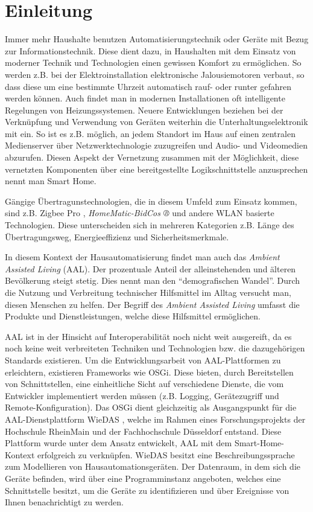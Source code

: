 \chapter{Einleitung}

Immer mehr Haushalte benutzen Automatisierungstechnik oder Geräte mit Bezug zur Informationstechnik.
Diese dient dazu, in Haushalten mit dem Einsatz von moderner Technik und Technologien einen gewissen Komfort
zu ermöglichen.
So werden z.B. bei der Elektroinstallation elektronische Jalousiemotoren verbaut, so dass diese
um eine bestimmte Uhrzeit automatisch rauf- oder runter gefahren werden können.
Auch findet man in modernen Installationen oft intelligente Regelungen von Heizungssystemen.
Neuere Entwicklungen beziehen bei der Verknüpfung und Verwendung von Geräten weiterhin die
Unterhaltungselektronik mit ein.
So ist es z.B. möglich, an jedem Standort im Haus auf einen zentralen Medienserver über Netzwerktechnologie
zuzugreifen und Audio- und Videomedien abzurufen.
Diesen Aspekt der Vernetzung zusammen mit der Möglichkeit, diese vernetzten Komponenten über eine
bereitgestellte Logikschnittstelle anzusprechen nennt man Smart Home.

Gängige Übertragunstechnologien, die in diesem Umfeld zum Einsatz kommen, sind z.B.
Zigbee Pro \cite{zigbee_p}, \emph{HomeMatic-BidCos ®} \cite{homematic_eq3} und andere WLAN basierte
Technologien.
Diese unterscheiden sich in mehreren Kategorien z.B. Länge des Übertragungsweg, Energieeffizienz und
Sicherheitsmerkmale.

In diesem Kontext der Hausautomatisierung findet man auch das \emph{Ambient Assisted Living} (AAL).
Der prozentuale Anteil der alleinstehenden und älteren Bevölkerung steigt stetig.
Dies nennt man den ``demografischen Wandel''.
Durch die Nutzung und Verbreitung technischer Hilfsmittel im Alltag versucht man, diesen Menschen
zu helfen.
Der Begriff des \emph{Ambient Assisted Living} umfasst die Produkte und Dienstleistungen, welche
diese Hilfsmittel ermöglichen.

AAL ist in der Hinsicht auf Interoperabilität noch nicht weit ausgereift, da es noch keine weit verbreiteten
Techniken und Technologien bzw. die dazugehörigen Standards existieren.
Um die Entwicklungsarbeit von AAL-Plattformen zu erleichtern, existieren Frameworks wie OSGi\cite{osgi}.
Diese bieten, durch Bereitstellen von Schnittstellen, eine einheitliche Sicht auf verschiedene Dienste,
die vom Entwickler implementiert werden müssen (z.B. Logging, Gerätezugriff und Remote-Konfiguration).
Das OSGi dient gleichzeitig als Ausgangspunkt für die AAL-Dienstplattform WieDAS \cite{wiedas}, welche
im Rahmen eines Forschungsprojekts der Hochschule RheinMain und der Fachhochschule Düsseldorf entstand.
Diese Plattform wurde unter dem Ansatz entwickelt, AAL mit dem Smart-Home-Kontext erfolgreich
zu verknüpfen.
WieDAS besitzt eine Beschreibungssprache zum Modellieren von Hausautomationsgeräten.
Der Datenraum, in dem sich die Geräte befinden, wird über eine Programminstanz angeboten, welches
eine Schnittstelle besitzt, um die Geräte zu identifizieren und über Ereignisse von Ihnen
benachrichtigt zu werden.

